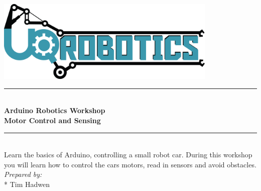 \begin{titlepage}
\renewcommand{\hrule}{\rule{\linewidth}{0.5mm}}

\centering
\includegraphics[width=400px]{Robotics-Logo-Light.png}
\\[1.5cm]
\hrule
\\[0.5cm]
{\huge \bfseries Arduino Robotics Workshop}\\
{\large \bfseries Motor Control and Sensing}
\\[0.4cm]
\hrule
\\[0.5cm]
Learn the basics of Arduino, controlling a small robot car. During this workshop you will learn how to control the cars motors, read in sensors and avoid obstacles.
\\[5cm]
\Large \emph{Prepared by:}
\\*
Tim Hadwen
\newpage
\end{titlepage}